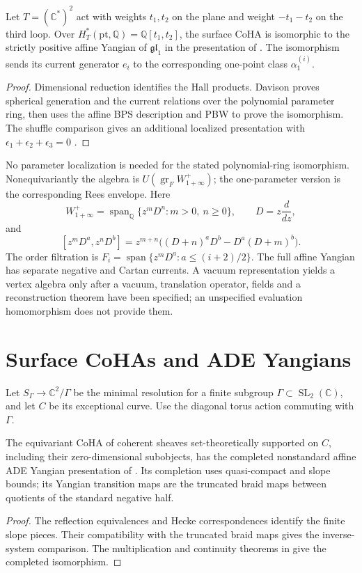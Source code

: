 \begin{theorem}
Let $T=(\mathbb C^*)^2$ act with weights $t_1,t_2$ on the plane and
weight $-t_1-t_2$ on the third loop. Over
$H_T^*(\mathrm{pt},\mathbb Q)=\mathbb Q[t_1,t_2]$, the surface CoHA
is isomorphic to the strictly positive affine Yangian of
$\mathfrak{gl}_1$ in the presentation of \cite{DavisonAffineBPS}.
The isomorphism sends its current generator $e_i$ to the corresponding
one-point class $\alpha_1^{(i)}$.
\end{theorem}
\begin{proof}
Dimensional reduction identifies the Hall products. Davison proves
spherical generation and the current relations over the polynomial
parameter ring, then uses the affine BPS description and PBW to prove
the isomorphism. The shuffle comparison gives an additional localized
presentation with $\epsilon_1+\epsilon_2+\epsilon_3=0$
\cite{DavisonAffineBPS,DavisonMeinhardt,SVYangians,Tsymbaliuk}.
\end{proof}

No parameter localization is needed for the stated polynomial-ring
isomorphism. Nonequivariantly the algebra is
$U(\operatorname{gr}_F W_{1+\infty}^+)$; the one-parameter version is
the corresponding Rees envelope. Here
\[
 W_{1+\infty}^+=\operatorname{span}_{\mathbb Q}
   \{z^mD^n:m>0,\ n\geq0\},\qquad D=z\frac{d}{dz},
\]
and
\[
 [z^mD^a,z^nD^b]
 =z^{m+n}\bigl((D+n)^aD^b-D^a(D+m)^b\bigr).
\]
The order filtration is
$F_i=\operatorname{span}\{z^mD^a:a\leq(i+2)/2\}$.
The full affine Yangian has separate negative and Cartan currents.
A vacuum representation yields a vertex algebra only after a vacuum,
translation operator, fields and a reconstruction theorem have been
specified; an unspecified evaluation homomorphism does not provide them.

\section{Surface CoHAs and ADE Yangians}
Let $S_\Gamma\to\mathbb C^2/\Gamma$ be the minimal resolution for
a finite subgroup $\Gamma\subset\operatorname{SL}_2(\mathbb C)$,
and let $C$ be its exceptional curve. Use the diagonal torus action
commuting with $\Gamma$.

\begin{theorem}
The equivariant CoHA of coherent sheaves set-theoretically supported
on $C$, including their zero-dimensional subobjects, has the completed
nonstandard affine ADE Yangian presentation of \cite{DPPSSV}.
Its completion uses quasi-compact and slope bounds; its Yangian
transition maps are the truncated braid maps between quotients of
the standard negative half.
\end{theorem}
\begin{proof}
The reflection equivalences and Hecke correspondences identify the
finite slope pieces. Their compatibility with the truncated braid maps
gives the inverse-system comparison. The multiplication and continuity
theorems in \cite{DPPSSV} give the completed isomorphism.
\end{proof}

